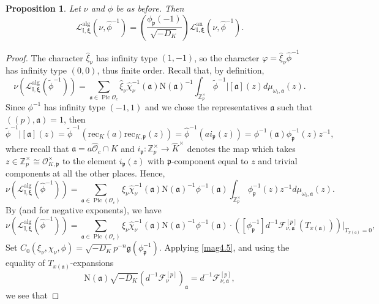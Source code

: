 \documentclass[a4paper,11pt]{amsart}
\numberwithin{equation}{section}
\theoremstyle{plain}
\newtheorem{proposition}[theorem]{Proposition}
\theoremstyle{definition}
\theoremstyle{remark}
\newcommand{\Z}{\mathbb Z}
\newcommand{\I}{\mathbb{I}}
\newcommand{\p}{\mathfrak{p}}
\DeclareMathOperator{\Pic}{Pic}
\begin{document}
\begin{proposition}\label{prop14.1}
Let $\nu$ and $\phi$ be as before. Then
\[\mathscr{L}_{\I,\boldsymbol{\xi}}^{\mathrm{alg}}(\nu,\hat{\phi}^{-1})=\left(\frac{\phi_\p(-1)}
{\sqrt{-D_K}}\right) \mathscr{L}^\mathrm{an}_{\I,\boldsymbol{\xi}}(\nu,\hat{\phi}^{-1}).\] 
\end{proposition}
\begin{proof}
The character $\hat{\xi}_\nu$ has infinity type $(1,-1)$, so the character $\varphi=\hat\xi_\nu\hat\phi^{-1}$ has infinity type $(0,0)$, thus finite order.
Recall that, by definition, 
\[
\nu(\mathscr{L}^\mathrm{alg}_{\I,\boldsymbol{\xi}}({\tilde\phi}^{-1}))= \sum_{\mathfrak{a}\in \Pic{\mathcal{O}_c}} \hat{\xi}_\nu\hat{\chi}^{-1}_\nu(\mathfrak{a})\mathrm{N}(\mathfrak{a})^{-1} \int_{\Z_p^\times} 
\tilde{\phi}^{-1} | [\mathfrak{a}] (z) d\mu_{\omega_\I,{\mathfrak{a}}}(z).
\]
Since $\phi^{-1}$ has infinity type $(-1,1)$ and we chose the representatives $\mathfrak{a}$ such that $((p),\mathfrak{a})=1$,
then 
\[\tilde{\phi}^{-1}|[\mathfrak{a}](z)=\tilde{\phi}^{-1}(\mathrm{rec}_{K}(a)\mathrm{rec}_{K,\mathfrak{p}}(z))=
\hat{\phi}^{-1}(ai_\mathfrak{p}(z))=
\phi^{-1}(\mathfrak{a})\phi_{\mathfrak{p}}^{-1}(z)z^{-1},\] 
where recall that $\mathfrak{a}=a\widehat{\mathcal{O}}_c\cap K$ and $i_\mathfrak{p}\colon \Z_p^\times\rightarrow\widehat{K}^\times$ denotes the map which takes $z\in \Z_p^\times \cong \mathcal{O}_{K,\mathfrak{p}}^\times$ to the element $i_\mathfrak{p}(z)$ with  $\mathfrak{p}$-component equal to $z$ and trivial components at all the other places. 
Hence,
\[
\nu(\mathscr{L}^\mathrm{alg}_{\I,\boldsymbol{\xi}}(\hat{\phi}^{-1}))
= \sum_{\mathfrak{a}\in \Pic({\mathcal{O}_c})} \hat{\xi}_\nu\hat{\chi}^{-1}_\nu(\mathfrak{a}){\mathrm{N}}(\mathfrak{a})^{-1} \phi^{-1}(\mathfrak{a}) \int_{\Z_p^\times}
\phi_{\mathfrak{p}}^{-1}(z)z^{-1} d\mu_{\omega_\I,\mathfrak{a}}(z).
\]
By \cite[\S 3.5, (5)]{hida-elementary} (and \cite[(6.7)]{Magrone} for negative exponents), we have
\[
\nu(\mathscr{L}^\mathrm{alg}_{\I,\boldsymbol{\xi}}(\hat{\phi}^{-1})) = \sum_{\mathfrak{a}\in \Pic({\mathcal{O}_c})} \hat{\xi}_\nu\hat{\chi}^{-1}_\nu(\mathfrak{a}){\mathrm{N}}(\mathfrak{a})^{-1} \phi^{-1}(\mathfrak{a})\cdot 
([
\phi_{\mathfrak{p}}^{-1}] d^{-1} {\mathcal{F}}_{\nu,\mathfrak{a}}^{{[p]}}(T_{x(\mathfrak{a})}) )|_{T_{x(\mathfrak{a})}=0},
\]
Set $C_0(\xi_\nu,\chi_\nu,\phi)=\sqrt{-D_K}p^{-n}\mathfrak{g}(
\phi^{-1}_\mathfrak{p})$. Applying \eqref{mag4.5}, and using the equality of $T_{x(\mathfrak{a})}$-expansions \[\mathrm{N}(\mathfrak{a})\sqrt{-D_K}(d^{-1}{\mathcal{F}}_{\nu}^{[p]})_{\mathfrak{a}}=d^{-1}{\mathcal{F}}_{\nu,\mathfrak{a}}^{[p]},\] we see that 

\end{proof}
\end{document}

